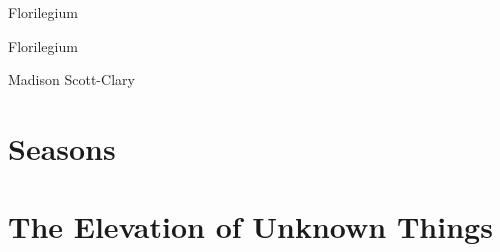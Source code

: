 \documentclass[10pt]{memoir}
\begin{document}
  \frontmatter

  \thispagestyle{empty}
  \null
  \vfill
  \begin{flushright}
    \DisplayFont Florilegium
  \end{flushright}
  \vfill
  \cleardoublepage

  \pagestyle{plain}

  \doublespacing

  \begin{flushright}
    \null
    \vfill
    {\Huge\DisplayFont Florilegium}

    \vfill

    {\Large\DisplayFont Madison Scott-Clary}
  \end{flushright}
  \thispagestyle{empty}

  \newpage

  

  \tableofcontents*
  \newpage
  \null
  \cleardoublepage



  \mainmatter

  \pagestyle{ourbook}

  \chapter{Seasons}
  
  

  \chapter{The Elevation of Unknown Things}
  \setcounter{footnote}{0}
  
  

  \backmatter

  \markboth{}{}


  \printbibliography[title={Works cited}]
\end{document}
